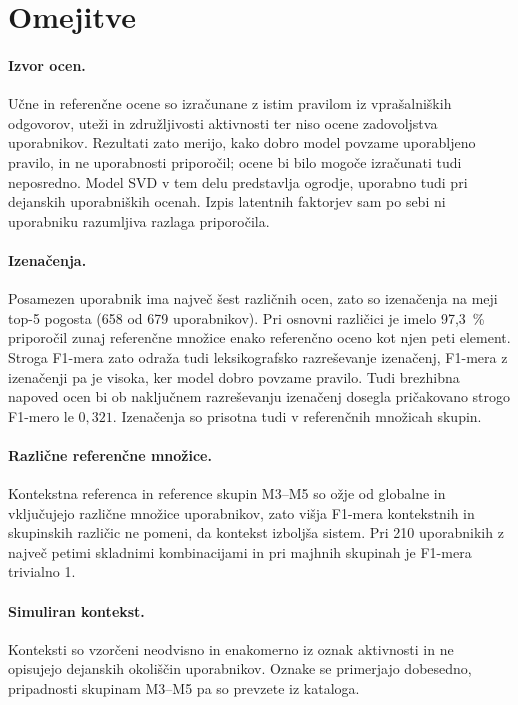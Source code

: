 \documentclass[a4paper,twoside,openright,12pt,slovene]{book}
\begin{document}
\section{Omejitve}
\label{sec:limitations}

\paragraph{Izvor ocen.}
Učne in referenčne ocene so izračunane z istim pravilom iz vprašalniških
odgovorov, uteži in združljivosti aktivnosti ter niso ocene zadovoljstva
uporabnikov. Rezultati zato merijo, kako dobro model povzame uporabljeno
pravilo, in ne uporabnosti priporočil; ocene bi bilo mogoče izračunati tudi
neposredno. Model SVD v tem delu predstavlja ogrodje, uporabno tudi pri
dejanskih uporabniških ocenah. Izpis latentnih faktorjev sam po sebi
ni uporabniku razumljiva razlaga priporočila.

\paragraph{Izenačenja.}
Posamezen uporabnik ima največ šest različnih ocen, zato so izenačenja na meji
top-5 pogosta (658 od 679 uporabnikov). Pri osnovni različici je imelo
97,3~\% priporočil zunaj referenčne množice enako referenčno oceno kot
njen peti element. Stroga F1-mera zato odraža tudi leksikografsko razreševanje
izenačenj, F1-mera z izenačenji pa je visoka, ker model dobro povzame
pravilo. Tudi brezhibna napoved ocen bi ob naključnem razreševanju
izenačenj dosegla pričakovano strogo F1-mero le $0{,}321$.
Izenačenja so prisotna tudi v referenčnih množicah skupin.

\paragraph{Različne referenčne množice.}
Kontekstna referenca in reference skupin M3--M5 so ožje od globalne in
vključujejo različne množice uporabnikov, zato višja F1-mera kontekstnih
in skupinskih različic ne pomeni, da kontekst izboljša sistem. Pri
210 uporabnikih z največ petimi skladnimi kombinacijami in pri majhnih
skupinah je F1-mera trivialno 1.

\paragraph{Simuliran kontekst.}
Konteksti so vzorčeni neodvisno in enakomerno iz oznak aktivnosti in
ne opisujejo dejanskih okoliščin uporabnikov. Oznake se primerjajo
dobesedno, pripadnosti skupinam M3--M5 pa so prevzete iz kataloga.
\end{document}
